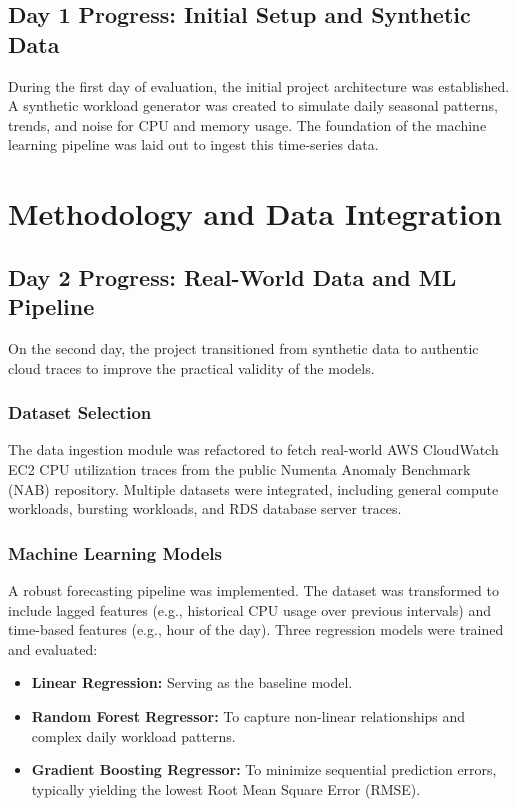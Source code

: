 \documentclass[journal,onecolumn]{IEEEtran}
\begin{document}
\subsection{Day 1 Progress: Initial Setup and Synthetic Data}
During the first day of evaluation, the initial project architecture was established. A synthetic workload generator was created to simulate daily seasonal patterns, trends, and noise for CPU and memory usage. The foundation of the machine learning pipeline was laid out to ingest this time-series data.

\section{Methodology and Data Integration}
\subsection{Day 2 Progress: Real-World Data and ML Pipeline}
On the second day, the project transitioned from synthetic data to authentic cloud traces to improve the practical validity of the models. 

\subsubsection{Dataset Selection}
The data ingestion module was refactored to fetch real-world AWS CloudWatch EC2 CPU utilization traces from the public Numenta Anomaly Benchmark (NAB) repository. Multiple datasets were integrated, including general compute workloads, bursting workloads, and RDS database server traces.

\subsubsection{Machine Learning Models}
A robust forecasting pipeline was implemented. The dataset was transformed to include lagged features (e.g., historical CPU usage over previous intervals) and time-based features (e.g., hour of the day). Three regression models were trained and evaluated:
\begin{itemize}
    \item \textbf{Linear Regression:} Serving as the baseline model.
    \item \textbf{Random Forest Regressor:} To capture non-linear relationships and complex daily workload patterns.
    \item \textbf{Gradient Boosting Regressor:} To minimize sequential prediction errors, typically yielding the lowest Root Mean Square Error (RMSE).
\end{itemize}
\end{document}
